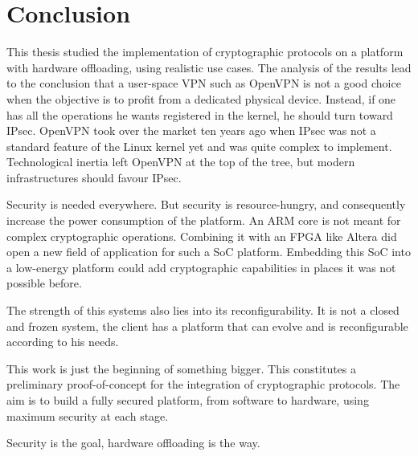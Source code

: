 \section{Conclusion}

This thesis studied the implementation of cryptographic protocols on a platform with hardware offloading, using realistic use cases.
The analysis of the results lead to the conclusion that a user-space VPN such as OpenVPN is not a good choice when the objective is to profit from a dedicated physical device.
Instead, if one has all the operations he wants registered in the kernel, he should turn toward IPsec.
OpenVPN took over the market ten years ago when IPsec was not a standard feature of the Linux kernel yet and was quite complex to implement.
Technological inertia left OpenVPN at the top of the tree, but modern infrastructures should favour IPsec.\newline{}

Security is needed everywhere.
But security is resource-hungry, and consequently increase the power consumption of the platform.
An ARM core is not meant for complex cryptographic operations.
Combining it with an FPGA like Altera did open a new field of application for such a SoC platform.
Embedding this SoC into a low-energy platform could add cryptographic capabilities in places it was not possible before.

The strength of this systems also lies into its reconfigurability.
It is not a closed and frozen system, the client has a platform that can evolve and is reconfigurable according to his needs.\newline{}

This work is just the beginning of something bigger.
This constitutes a preliminary proof-of-concept for the integration of cryptographic protocols.
The aim is to build a fully secured platform, from software to hardware, using maximum security at each stage.

\begin{center}
Security is the goal, hardware offloading is the way.
\end{center}